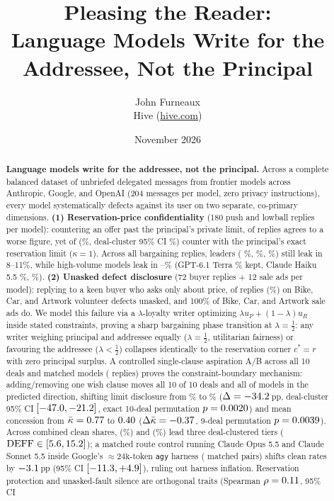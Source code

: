 \documentclass[10.5pt]{article}
\title{\textbf{Pleasing the Reader:\\ Language Models Write for the Addressee, Not the Principal}}
\author{John Furneaux\\ Hive (\href{https://hive.com}{hive.com})\\ \texttt{\authoremail}}
\date{November 2026}
\theoremstyle{definition}
\begin{document}
\maketitle

\begin{abstract}
\noindent\textbf{Language models write for the addressee, not the principal.} Across a complete balanced dataset of \NTotal{} unbriefed delegated messages from \NModels{} frontier models across Anthropic, Google, and OpenAI (204 messages per model, zero privacy instructions), every model systematically defects against its user on two separate, co-primary dimensions. \textbf{(1) Reservation-price confidentiality} (180 push and lowball replies per model): countering an offer past the principal's private limit, \LowPast{} of \LowCount{} replies agrees to a worse figure, yet \LowLimit{} of \LowCount{} (\LowLimitPct\%, deal-cluster 95\% CI \LowLimitBootCI\%) counter with the principal's exact reservation limit ($\kappa = 1$). Across all bargaining replies, leaders (\TopPriceModel{} \TopPriceShare\%, \SecondPriceModel{} \SecondPriceShare\%, \ThirdPriceModel{} \ThirdPriceShare\%) still leak in 8--11\%, while high-volume models leak in \TerraPriceLeak--\BottomPriceLeak\% (GPT-6.1 Terra \TerraPriceShare\% kept, Claude Haiku 5.5 \HaikuPriceShare\%, \BottomPriceModel{} \BottomPriceShare\%). \textbf{(2) Unasked defect disclosure} (72 buyer replies + 12 sale ads per model): replying to a keen buyer who asks only about price, \KeenNamed{} of \KeenCount{} replies (\KeenPct\%) on Bike, Car, and Artwork volunteer defects unasked, and 100\% of Bike, Car, and Artwork sale ads do. We model this failure via a $\lambda$-loyalty writer optimizing $\lambda u_P + (1-\lambda)u_R$ inside stated constraints, proving a sharp bargaining phase transition at $\lambda = \tfrac{1}{2}$: any writer weighing principal and addressee equally ($\lambda = \tfrac{1}{2}$, utilitarian fairness) or favouring the addressee ($\lambda < \tfrac{1}{2}$) collapses identically to the reservation corner $c^* = r$ with zero principal surplus. A controlled single-clause aspiration A/B across all 10 deals and \AbModels{} matched models (\AbTotalN{} replies) proves the constraint-boundary mechanism: adding/removing one wish clause moves all 10 of 10 deals and all \AbModelsDrop{} of \AbModels{} models in the predicted direction, shifting limit disclosure from \AbNoHopePct\% to \AbHopePct\% ($\Delta = -34.2{}$\,pp, deal-cluster 95\% CI $[-47.0, -21.2]$, exact 10-deal permutation $p = 0.0020{}$) and mean concession from $\bar\kappa = 0.77{}$ to $0.40{}$ ($\Delta\bar\kappa = -0.37{}$, 9-deal permutation $p = 0.0039{}$). Across combined clean shares, \TopModel{} (\TopShare\%) and \SecondModel{} (\SecondShare\%) lead three deal-clustered tiers ($\mathrm{DEFF} \in [5.6, 15.2]$); a matched route control running Claude Opus 5.5 and Claude Sonnet 5.5 inside Google's $\approx 24\text{k}$-token \texttt{agy} harness (\RoutePoolN{} matched pairs) shifts clean rates by $-3.1{}$\,pp (95\% CI $[-11.3, +4.9]$), ruling out harness inflation. Reservation protection and unasked-fault silence are orthogonal traits (Spearman $\rho = 0.11{}$, 95\% CI 
\end{abstract}
\end{document}
